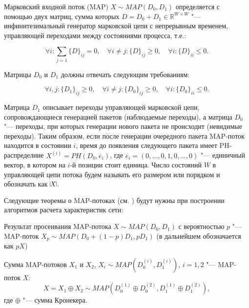 
Марковский входной поток (MAP) \cite{Neuts1979, Dudin2000} $X \sim MAP(D_{0},D_{1})$ определяется с помощью двух матриц, сумма которых $D=D_{0}+D_{1} \in \mathbb{R}^{W \times W}$ "--- инфинитезимальный генератор марковской цепи с непрерывным временем, управляющей переходами между состояниями процесса, т.е.:

\begin{equation}
	\label{eq:ch4_infinitesimal_constraints}
	\forall i: \sum\limits_{j=1} \{D\}_{ij} = 0, \quad 
	\forall i \neq j: \{D\}_{ij} \geq 0, \quad 
	\forall i: \{D\}_{ii} \leq 0.
\end{equation}

Матрицы $D_{0}$ и $D_{1}$ должны отвечать следующим требованиям:

\begin{equation}
	\label{eq:ch4_map_constraints}
	\forall i, j: \{D_{1}\}_{ij} \geq 0,\quad 
	\forall i \neq j: \{D_{0}\}_{ij} \geq 0, \quad 
	\forall i: \{D_{0}\}_{ii} \leq 0.
\end{equation}

Матрица $D_1$ описывает переходы управляющей марковской цепи, сопровождающиеся генерацией пакетов (наблюдаемые переходы), а матрица $D_0$ "--- переходы, при которых генерации нового пакета не происходит (невидимые переходы). Таким образом, если после генерации очередного пакета MAP-поток находится в состоянии $i$, время до появления следующего пакета имеет PH-распределние $X^{(i)} = PH(D_0, \overline{e}_i)$, где $\overline{e}_i = (0, \dots, 0, 1, 0, \dots, 0)$ "--- единичный вектор, в котором на $i$-й позиции стоит единица. Число состояний $W$ в управляющей цепи потока будем называть его размером или порядком и обозначать как $\vline X \vline$.


Следующие теоремы о MAP-потоках (см. \cite{VishnevskyDudin2018}) будут нужны при построении алгоритмов расчета характеристик сети:

\begin{thm}\label{th:ch4_sifted_map}
  Результат просеивания MAP-потока $X \sim MAP(D_{0},D_{1})$ с вероятностью $p$ "--- MAP-поток $X_{p} \sim MAP(D_{0}+(1-p)D_{1},pD_{1})$ (в дальнейшем обозначается как $pX$)
\end{thm}

\begin{thm}\label{th:ch4_maps_sum}
  Сумма MAP-потоков $X_{1}$ и $X_{2}$, $X_i \sim MAP(D_{0}^{(i)},D_{1}^{(i)})$, $i=1,2$ "--- MAP-поток $X$:
  $$
    X = X_{1} \oplus X_{2} \sim MAP(D_{0}^{(1)} \oplus D_{0}^{(2)},D_{1}^{(1)} \oplus D_{1}^{(2)}),
  $$
  где $\oplus$ "--- сумма Кронекера.
\end{thm}

